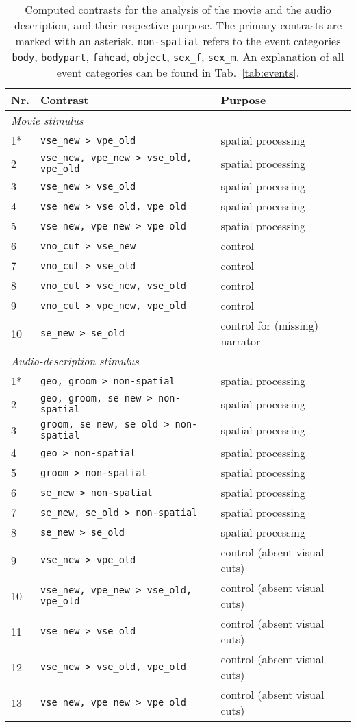 \documentclass[english]{article}
\begin{document}
\begin{table*}[tbp]
  \caption{Computed contrasts for the analysis of the movie and the audio
    description, and their respective purpose.
    The primary contrasts are marked with an asterisk.
    \texttt{non-spatial} refers to the event categories
    \texttt{body}, \texttt{bodypart}, \texttt{fahead},
    \texttt{object}, \texttt{sex\_f}, \texttt{sex\_m}.
    An explanation of all event categories can be found in
    Tab.~\ref{tab:events}.
    }
\label{tab:contrasts}
\begin{tabular}{lll}
\toprule
\textbf{Nr.} &  \textbf{Contrast} & \textbf{Purpose} \\
\midrule
\multicolumn{3}{l}{\textit{Movie stimulus}}\\
1* & \texttt{vse\_new > vpe\_old} & spatial processing \tabularnewline
2 & \texttt{vse\_new, vpe\_new > vse\_old, vpe\_old} & spatial processing \tabularnewline
3 & \texttt{vse\_new > vse\_old} & spatial processing \tabularnewline
4 & \texttt{vse\_new > vse\_old, vpe\_old} & spatial processing \tabularnewline
5 & \texttt{vse\_new, vpe\_new > vpe\_old} & spatial processing \tabularnewline
6 & \texttt{vno\_cut > vse\_new} & control \tabularnewline
7 & \texttt{vno\_cut > vse\_old} & control \tabularnewline
8 & \texttt{vno\_cut > vse\_new, vse\_old} & control \tabularnewline
9 & \texttt{vno\_cut > vpe\_new, vpe\_old} & control \tabularnewline
10 & \texttt{se\_new > se\_old} & control for (missing) narrator \tabularnewline
\midrule
\multicolumn{3}{l}{\textit{Audio-description stimulus}}\\
1* & \texttt{geo, groom > non-spatial} & spatial processing \tabularnewline
2 & \texttt{geo, groom, se\_new > non-spatial} & spatial processing \tabularnewline
3 & \texttt{groom, se\_new, se\_old > non-spatial}  & spatial processing \tabularnewline
4 & \texttt{geo > non-spatial} & spatial processing \tabularnewline
5 & \texttt{groom > non-spatial} & spatial processing \tabularnewline
6 & \texttt{se\_new > non-spatial} & spatial processing \tabularnewline
7 & \texttt{se\_new, se\_old > non-spatial} & spatial processing \tabularnewline
8 & \texttt{se\_new > se\_old} & spatial processing \tabularnewline
9 & \texttt{vse\_new > vpe\_old} & control (absent visual cuts) \tabularnewline
10 & \texttt{vse\_new, vpe\_new > vse\_old, vpe\_old} & control (absent visual cuts) \tabularnewline
11 & \texttt{vse\_new > vse\_old} & control (absent visual cuts) \tabularnewline
12 & \texttt{vse\_new > vse\_old, vpe\_old} & control (absent visual cuts) \tabularnewline
13 & \texttt{vse\_new, vpe\_new > vpe\_old} & control (absent visual cuts) \tabularnewline
\bottomrule
\end{tabular}
\end{table*}
\end{document}
